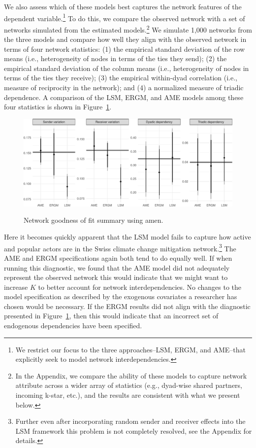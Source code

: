 \documentclass[12pt,pdflatex]{elsarticle}
\newcommand{\pkg}[1]{{\fontseries{b}\selectfont #1}}
\begin{document}
We also assess which of these models best captures the network features of the dependent variable.\footnote{We restrict our focus to the three approaches--LSM, ERGM, and AME--that explicitly
seek to model network interdependencies.} To do this, we compare the observed network with a set of networks simulated from the estimated models.\footnote{In the Appendix, we compare the ability of these models to capture network attribute across a wider array of statistics (e.g., dyad-wise shared partners, incoming k-star, etc.), and the results are consistent with what we present below.} We simulate 1,000 networks from the three models and compare how well they align with the observed network in terms of four network statistics: (1) the empirical standard deviation of the row means (i.e., heterogeneity of nodes in terms of the ties they send); (2) the empirical standard deviation of the column means (i.e., heterogeneity of nodes in terms of the ties they receive); (3) the empirical within-dyad correlation (i.e., measure of reciprocity in the network); and (4) a normalized measure of triadic dependence. A comparison of the LSM, ERGM, and AME models among these four statistics is shown in Figure~\ref{fig:ergmAmePerf}.

\begin{figure}[ht]
	\centering
	\caption{Network goodness of fit summary using \pkg{amen}.}
	\includegraphics[width=1\textwidth]{Figure3_bw}
	\label{fig:ergmAmePerf}
\end{figure}
\FloatBarrier

Here it becomes quickly apparent that the LSM model fails to capture how active and popular actors are in the Swiss climate change mitigation network.\footnote{Further even after incorporating random sender and receiver effects into the LSM framework this problem is not completely resolved, see the Appendix for details.} The AME and ERGM specifications again both tend to do equally well. If when running this diagnostic, we found that the AME model did not adequately represent the observed network this would indicate that we might want to increase $K$ to better account for network interdependencies. No changes to the model specification as described by the exogenous covariates a researcher has chosen would be necessary. If the ERGM results did not align with the diagnostic presented in Figure~\ref{fig:ergmAmePerf}, then this would indicate that an incorrect set of endogenous dependencies have been specified. 
\end{document}

